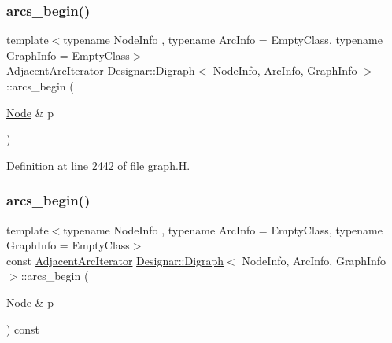 \subsubsection{\texorpdfstring{arcs\+\_\+begin()}{arcs\_begin()}\hspace{0.1cm}{\footnotesize\ttfamily [3/4]}}
{\footnotesize\ttfamily template$<$typename Node\+Info , typename Arc\+Info  = Empty\+Class, typename Graph\+Info  = Empty\+Class$>$ \\
\hyperlink{class_designar_1_1_digraph_1_1_adjacent_arc_iterator}{Adjacent\+Arc\+Iterator} \hyperlink{class_designar_1_1_digraph}{Designar\+::\+Digraph}$<$ Node\+Info, Arc\+Info, Graph\+Info $>$\+::arcs\+\_\+begin (\begin{DoxyParamCaption}\item[{\hyperlink{class_designar_1_1_digraph_a4dc921c41a480b7946a04170e997d8ae}{Node} \&}]{p }\end{DoxyParamCaption})\hspace{0.3cm}{\ttfamily [inline]}}



Definition at line 2442 of file graph.\+H.

\mbox{\label{class_designar_1_1_digraph_aa17a29b3ea956a3ad98e991fb13d0a20}} 
\subsubsection{\texorpdfstring{arcs\+\_\+begin()}{arcs\_begin()}\hspace{0.1cm}{\footnotesize\ttfamily [4/4]}}
{\footnotesize\ttfamily template$<$typename Node\+Info , typename Arc\+Info  = Empty\+Class, typename Graph\+Info  = Empty\+Class$>$ \\
const \hyperlink{class_designar_1_1_digraph_1_1_adjacent_arc_iterator}{Adjacent\+Arc\+Iterator} \hyperlink{class_designar_1_1_digraph}{Designar\+::\+Digraph}$<$ Node\+Info, Arc\+Info, Graph\+Info $>$\+::arcs\+\_\+begin (\begin{DoxyParamCaption}\item[{\hyperlink{class_designar_1_1_digraph_a4dc921c41a480b7946a04170e997d8ae}{Node} \&}]{p }\end{DoxyParamCaption}) const\hspace{0.3cm}{\ttfamily [inline]}}



